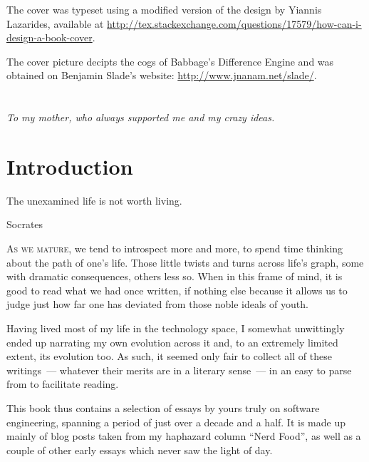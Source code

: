 \documentclass{book}
\begin{document}
The cover was typeset using a modified version of the design by
Yiannis Lazarides, available at
\url{http://tex.stackexchange.com/questions/17579/how-can-i-design-a-book-cover}.

The cover picture decipts the cogs of Babbage's Difference Engine and
was obtained on Benjamin Slade's website:
\url{http://www.jnanam.net/slade/}.

\endgroup

\pagestyle{empty}
\clearpage
\chapter*{}
\bigskip
\begin{flushright}
\footnotesize \emph{To my mother, who always supported me and my crazy ideas.}
\bigskip
\end{flushright}

\clearpage

\pagestyle{headings}
\setcounter{tocdepth}{3}
\tableofcontents

\pagestyle{empty}
\clearpage

\chapter{Introduction}

\epigraph{The unexamined life is not worth living.}{Socrates}

\lettrine{A}{s we mature}, we tend to introspect more and more, to
spend time thinking about the path of one's life. Those little twists
and turns across life's graph, some with dramatic consequences, others
less so. When in this frame of mind, it is good to read what we had
once written, if nothing else because it allows us to judge just how
far one has deviated from those noble ideals of youth.

Having lived most of my life in the technology space, I somewhat
unwittingly ended up narrating my own evolution across it and, to an
extremely limited extent, its evolution too. As such, it seemed only
fair to collect all of these writings~--- whatever their merits are in
a literary sense~--- in an easy to parse from to facilitate reading.

This book thus contains a selection of essays by yours truly on
software engineering, spanning a period of just over a decade and a
half. It is made up mainly of blog posts taken from my haphazard
column ``Nerd Food'', as well as a couple of other early essays which
never saw the light of day.
\end{document}
